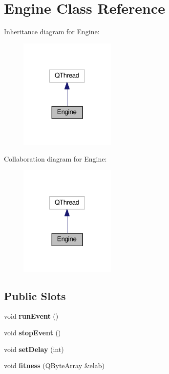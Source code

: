 \hypertarget{classEngine}{}\section{Engine Class Reference}
\label{classEngine}


Inheritance diagram for Engine\+:
\nopagebreak
\begin{figure}[H]
\begin{center}
\leavevmode
\includegraphics[width=134pt]{classEngine__inherit__graph}
\end{center}
\end{figure}


Collaboration diagram for Engine\+:
\nopagebreak
\begin{figure}[H]
\begin{center}
\leavevmode
\includegraphics[width=134pt]{classEngine__coll__graph}
\end{center}
\end{figure}
\subsection*{Public Slots}
\begin{DoxyCompactItemize}
\item 
\mbox{\label{classEngine_a5b393cd5aaebe5eb8a5b225ee31fa6bb}} 
void {\bfseries run\+Event} ()
\item 
\mbox{\label{classEngine_a98956a88f9a0a7e8fedf77cf9c246dd1}} 
void {\bfseries stop\+Event} ()
\item 
\mbox{\label{classEngine_a16bca5737248e72fb0ba519f75adfed0}} 
void {\bfseries set\+Delay} (int)
\item 
\mbox{\label{classEngine_ac2275923326b242207830b6a99d37b4a}} 
void {\bfseries fitness} (Q\+Byte\+Array \&elab)
\end{DoxyCompactItemize}
